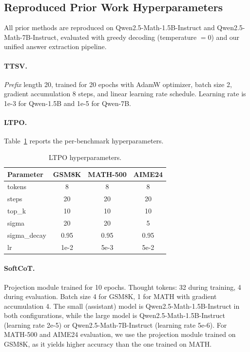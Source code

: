 \subsection{Reproduced Prior Work Hyperparameters}\label{app:prior_hp}

All prior methods are reproduced on Qwen2.5-Math-1.5B-Instruct and Qwen2.5-Math-7B-Instruct, evaluated with greedy decoding (temperature $= 0$) and our unified answer extraction pipeline.

\paragraph{TTSV.} \emph{Prefix} length 20, trained for 20 epochs with AdamW optimizer, batch size 2, gradient accumulation 8 steps, and linear learning rate schedule. Learning rate is 1e-3 for Qwen-1.5B and 1e-5 for Qwen-7B.

\paragraph{LTPO.} Table~\ref{tab:hp_ltpo} reports the per-benchmark hyperparameters.

\begin{table}[H]
\centering
\caption{LTPO hyperparameters.}
\label{tab:hp_ltpo}
\footnotesize
\renewcommand{\arraystretch}{0.9}
\begin{tabular}{lccc}
\toprule
\textbf{Parameter} & \textbf{GSM8K} & \textbf{MATH-500} & \textbf{AIME24} \\
\midrule
tokens & 8 & 8 & 8 \\
steps & 20 & 20 & 20 \\
top\_k & 10 & 10 & 10 \\
sigma & 20 & 20 & 5 \\
sigma\_decay & 0.95 & 0.95 & 0.95 \\
lr & 1e-2 & 5e-3 & 5e-2 \\
\bottomrule
\end{tabular}
\end{table}

\paragraph{SoftCoT.} Projection module trained for 10 epochs. Thought tokens: 32 during training, 4 during evaluation. Batch size 4 for GSM8K, 1 for MATH with gradient accumulation 4. The small (assistant) model is Qwen2.5-Math-1.5B-Instruct in both configurations, while the large model is Qwen2.5-Math-1.5B-Instruct (learning rate 2e-5) or Qwen2.5-Math-7B-Instruct (learning rate 5e-6). For MATH-500 and AIME24 evaluation, we use the projection module trained on GSM8K, as it yields higher accuracy than the one trained on MATH.

